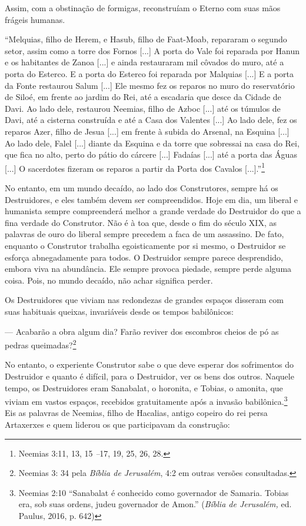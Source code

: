 Assim, com a obstinação de formigas, reconstruíam o Eterno com suas mãos
frágeis humanas.

``Melquias, filho de Herem, e Hasub, filho de Faat-Moab, repararam o
segundo setor, assim como a torre dos Fornos {[}...{]} A porta do Vale
foi reparada por Hanun e os habitantes de Zanoa {[}...{]} e ainda
restauraram mil côvados do muro, até a porta do Esterco. E a porta do
Esterco foi reparada por Malquias {[}...{]} E a porta da Fonte restaurou
Salum {[}...{]} Ele mesmo fez os reparos no muro do reservatório de
Siloé, em frente ao jardim do Rei, até a escadaria que desce da Cidade
de Davi. Ao lado dele, restaurou Neemias, filho de Azboc {[}...{]} até
os túmulos de Davi, até a cisterna construída e até a Casa dos Valentes
{[}...{]} Ao lado dele, fez os reparos Azer, filho de Jesua {[}...{]} em
frente à subida do Arsenal, na Esquina {[}...{]} Ao lado dele, Falel
{[}...{]} diante da Esquina e da torre que sobressai na casa do Rei, que
fica no alto, perto do pátio do cárcere {[}...{]} Fadaías {[}...{]} até
a porta das Águas {[}...{]} O sacerdotes fizeram os reparos a partir da
Porta dos Cavalos {[}...{]}.''\footnote{Neemias 3:11, 13, 15
  \emph{--}17, 19, 25, 26, 28.}

No entanto, em um mundo decaído, ao lado dos Construtores, sempre há os
Destruidores, e eles também devem ser compreendidos. Hoje em dia, um
liberal e humanista sempre compreenderá melhor a grande verdade do
Destruidor do que a fina verdade do Construtor. Não é à toa que, desde o
fim do século XIX, as palavras de ouro do liberal sempre precedem a faca
de um assassino. De fato, enquanto o Construtor trabalha egoisticamente
por si mesmo, o Destruidor se esforça abnegadamente para todos. O
Destruidor sempre parece desprendido, embora viva na abundância. Ele
sempre provoca piedade, sempre perde alguma coisa. Pois, no mundo
decaído, não achar significa perder.

Os Destruidores que viviam nas redondezas de grandes espaços disseram
com suas habituais queixas, invariáveis desde os tempos babilônicos:

--- Acabarão a obra algum dia? Farão reviver dos escombros cheios de pó
as pedras queimadas?\footnote{Neemias 3: 34 pela \emph{Bíblia de
  Jerusalém}, 4:2 em outras versões consultadas.}

No entanto, o experiente Construtor sabe o que deve esperar dos
sofrimentos do Destruidor e quanto é difícil, para o Destruidor, ver os
bens dos outros. Naquele tempo, os Destruidores eram Sanabalat, o
horonita, e Tobias, o amonita, que viviam em vastos espaços, recebidos
gratuitamente após a invasão babilônica.\footnote{Neemias 2:10
  ``Sanabalat é conhecido como governador de Samaria. Tobias era, sob
  suas ordens, judeu governador de Amon.'' (\emph{Bíblia de Jerusalém,}
  ed. Paulus, 2016, p. 642)} Eis as palavras de Neemias, filho de
Hacalias, antigo copeiro do rei persa Artaxerxes e quem liderou os que
participavam da construção:

